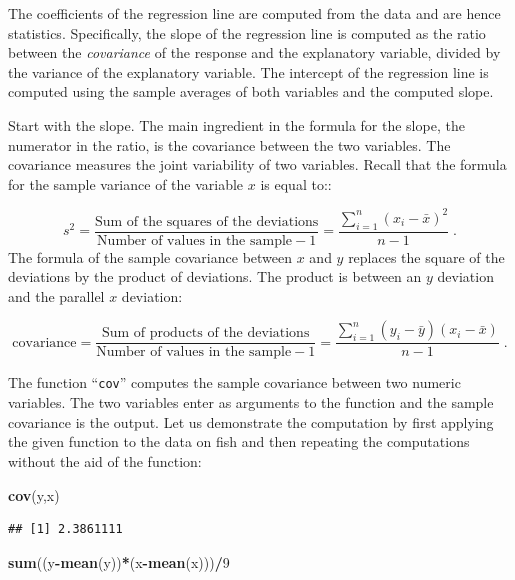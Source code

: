 \documentclass[]{krantz}
\makeatletter
\newenvironment{Shaded}{\begin{snugshade}}{\end{snugshade}}
\newcommand{\KeywordTok}[1]{\textcolor[rgb]{0.13,0.29,0.53}{\textbf{#1}}}
\newcommand{\DecValTok}[1]{\textcolor[rgb]{0.00,0.00,0.81}{#1}}
\newcommand{\OperatorTok}[1]{\textcolor[rgb]{0.81,0.36,0.00}{\textbf{#1}}}
\newcommand{\NormalTok}[1]{#1}
\newenvironment{kframe}{%
\medskip{}
\setlength{\fboxsep}{.8em}
 \def\at@end@of@kframe{}%
 \ifinner\ifhmode%
  \def\at@end@of@kframe{\end{minipage}}%
  \begin{minipage}{\columnwidth}%
 \fi\fi%
 \def\FrameCommand##1{\hskip\@totalleftmargin \hskip-\fboxsep
 \colorbox{shadecolor}{##1}\hskip-\fboxsep
     \hskip-\linewidth \hskip-\@totalleftmargin \hskip\columnwidth}%
 \MakeFramed {\advance\hsize-\width
   \@totalleftmargin\z@ \linewidth\hsize
   \@setminipage}}%
 {\par\unskip\endMakeFramed%
 \at@end@of@kframe}
\renewenvironment{Shaded}{\begin{kframe}}{\end{kframe}}
\theoremstyle{definition}
\theoremstyle{definition}
\theoremstyle{definition}
\theoremstyle{remark}
\makeatother
\begin{document}
The coefficients of the regression line are computed from the data and
are hence statistics. Specifically, the slope of the regression line is
computed as the ratio between the \emph{covariance} of the response and
the explanatory variable, divided by the variance of the explanatory
variable. The intercept of the regression line is computed using the
sample averages of both variables and the computed slope.

Start with the slope. The main ingredient in the formula for the slope,
the numerator in the ratio, is the covariance between the two variables.
The covariance measures the joint variability of two variables. Recall
that the formula for the sample variance of the variable \(x\) is equal
to::

\[s^2 = \frac{\mbox{Sum of the squares of the deviations}}{\mbox{Number of values in the sample}-1} = \frac{\sum_{i=1}^n (x_i - \bar x)^2}{n-1}\;.\]
The formula of the sample covariance between \(x\) and \(y\) replaces
the square of the deviations by the product of deviations. The product
is between an \(y\) deviation and the parallel \(x\) deviation:

\[\mbox{covariance} = \frac{\mbox{Sum of products of the deviations}}{\mbox{Number of values in the sample}-1} = \frac{\sum_{i=1}^n (y_i-\bar y)(x_i - \bar x)}{n-1}\;.\]

The function ``\texttt{cov}'' computes the sample covariance between two
numeric variables. The two variables enter as arguments to the function
and the sample covariance is the output. Let us demonstrate the
computation by first applying the given function to the data on fish and
then repeating the computations without the aid of the function:

\begin{Shaded}
\begin{Highlighting}[]
\KeywordTok{cov}\NormalTok{(y,x)}
\end{Highlighting}
\end{Shaded}

\begin{verbatim}
## [1] 2.3861111
\end{verbatim}

\begin{Shaded}
\begin{Highlighting}[]
\KeywordTok{sum}\NormalTok{((y}\OperatorTok{-}\KeywordTok{mean}\NormalTok{(y))}\OperatorTok{*}\NormalTok{(x}\OperatorTok{-}\KeywordTok{mean}\NormalTok{(x)))}\OperatorTok{/}\DecValTok{9}
\end{Highlighting}
\end{Shaded}
\end{document}
